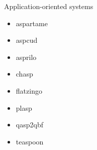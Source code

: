 \begin{frame}{Application-oriented systems}
  \begin{itemize}
  \item aspartame
  \item aspcud
  \item asprilo
  \item chasp
  \item flatzingo
  \item plasp
  \item qasp2qbf
  \item teaspoon
  \end{itemize}
\end{frame}
%
